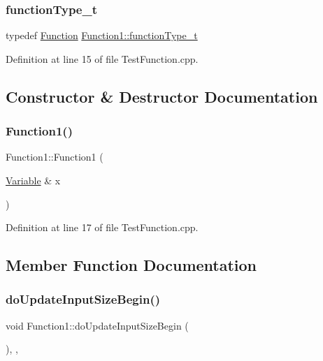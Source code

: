 \subsubsection{\texorpdfstring{function\+Type\+\_\+t}{functionType\_t}}
{\footnotesize\ttfamily typedef \hyperlink{classocra_1_1Function}{Function} \hyperlink{classFunction1_a3248b79eedbe37ed0e285db564a530fe}{Function1\+::function\+Type\+\_\+t}}



Definition at line 15 of file Test\+Function.\+cpp.



\subsection{Constructor \& Destructor Documentation}
\hypertarget{classFunction1_a6b618d85fab472effe2624a8384c1674}{}\label{classFunction1_a6b618d85fab472effe2624a8384c1674} 
\subsubsection{\texorpdfstring{Function1()}{Function1()}}
{\footnotesize\ttfamily Function1\+::\+Function1 (\begin{DoxyParamCaption}\item[{\hyperlink{classocra_1_1Variable}{Variable} \&}]{x }\end{DoxyParamCaption})\hspace{0.3cm}{\ttfamily [inline]}}



Definition at line 17 of file Test\+Function.\+cpp.



\subsection{Member Function Documentation}
\hypertarget{classFunction1_aec0bc51f050a1bd32cece26e524e5c97}{}\label{classFunction1_aec0bc51f050a1bd32cece26e524e5c97} 
\subsubsection{\texorpdfstring{do\+Update\+Input\+Size\+Begin()}{doUpdateInputSizeBegin()}}
{\footnotesize\ttfamily void Function1\+::do\+Update\+Input\+Size\+Begin (\begin{DoxyParamCaption}{ }\end{DoxyParamCaption})\hspace{0.3cm}{\ttfamily [inline]}, {\ttfamily [protected]}, {\ttfamily [virtual]}}

